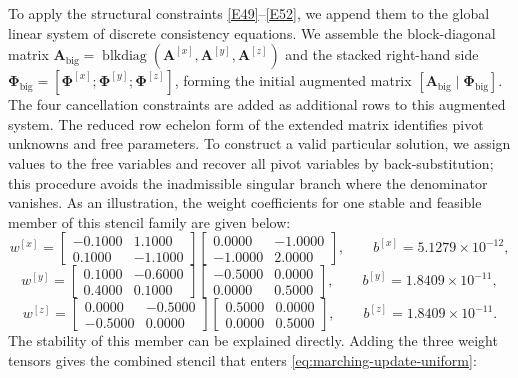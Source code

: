 \documentclass[pdflatex,sn-mathphys-num]{sn-jnl}%
\theoremstyle{thmstyleone}%
\theoremstyle{thmstyletwo}%
\theoremstyle{thmstylethree}%
\begin{document}
{To apply the structural constraints \eqref{E49}--\eqref{E52}, we append them to the global linear system of discrete consistency equations. We assemble the block-diagonal matrix $\boldsymbol{A}_{\text{big}}=\operatorname{blkdiag}(\boldsymbol{A}^{[x]},\boldsymbol{A}^{[y]},\boldsymbol{A}^{[z]})$ and the stacked right-hand side $\boldsymbol{\Phi}_{\text{big}}=[\boldsymbol{\Phi}^{[x]};\boldsymbol{\Phi}^{[y]};\boldsymbol{\Phi}^{[z]}]$, forming the initial augmented matrix $[\boldsymbol{A}_{\text{big}}\mid \boldsymbol{\Phi}_{\text{big}}]$. The four cancellation constraints are added as additional rows to this augmented system. The reduced row echelon form of the extended matrix identifies pivot unknowns and free parameters. To construct a valid particular solution, we assign values to the free variables and recover all pivot variables by back-substitution; this procedure avoids the inadmissible singular branch where the denominator vanishes.
As an illustration, the weight coefficients for one stable and feasible member of this stencil family are given below:
\[
w^{[x]}=
\begin{bmatrix}
   -0.1000  &  1.1000\\
    0.1000  & -1.1000
\end{bmatrix}
\begin{bmatrix}
    0.0000  & -1.0000\\
   -1.0000  &  2.0000
\end{bmatrix},\qquad
b^{[x]} = 5.1279\times 10^{-12},
\]
\[
w^{[y]}=
\begin{bmatrix}
    0.1000 &  -0.6000\\
    0.4000  &  0.1000
\end{bmatrix}
\begin{bmatrix}
   -0.5000     &    0.0000\\
         0.0000   & 0.5000
\end{bmatrix},\qquad
b^{[y]} = 1.8409\times 10^{-11},
\]
\[
w^{[z]}=
\begin{bmatrix}
    0.0000 &  -0.5000\\
   -0.5000   &     0.0000
\end{bmatrix}
\begin{bmatrix}
    0.5000    &    0.0000\\
        0.0000      & 0.5000
\end{bmatrix},\qquad
b^{[z]} = 1.8409\times 10^{-11}.
\]
The stability of this member can be explained directly. Adding the three weight tensors gives the combined stencil that enters \eqref{eq:marching-update-uniform}:
\[
\]}
\end{document}
